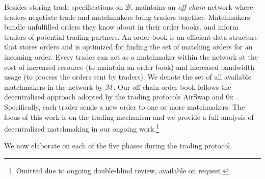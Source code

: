 Besides storing trade specifications on $ \mathcal{B} $, \ModelName{} maintains an \emph{off-chain} network where traders negotiate trade and matchmakers bring traders together.
Matchmakers bundle unfulfilled orders they know about in their order books, and inform traders of potential trading partners.
An order book is an efficient data structure that stores orders and is optimized for finding the set of matching orders for an incoming order.
Every trader can act as a matchmaker within the \ModelName{} network at the cost of increased resource (to maintain an order book) and increased bandwidth usage (to process the orders sent by traders).
We denote the set of all available matchmakers in the network by $ \mathcal{M} $.
Our off-chain order book follows the decentralized approach adopted by the trading protocols AirSwap and 0x~\cite{airswap}\cite{warren20170x}.
Specifically, each trader sends a new order to one or more matchmakers.
The focus of this work is on the trading mechanism and we provide a full analysis of decentralized matchmaking in our ongoing work.\footnote{Omitted due to ongoing double-blind review, available on request.}

We now elaborate on each of the five phases during the \ModelName{} trading protocol.



